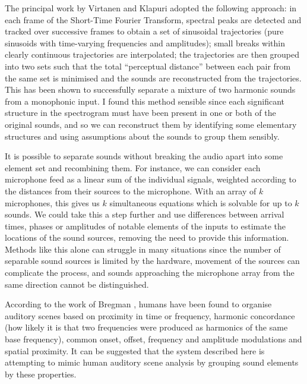 \documentclass[12pt,a4paper,twoside,openright]{report}
\begin{document}
The principal work by Virtanen and Klapuri \cite{virtanen2000separation} adopted the following approach: in each frame of the Short-Time Fourier Transform, spectral peaks are detected and tracked over successive frames to obtain a set of sinusoidal trajectories (pure sinusoids with time-varying frequencies and amplitudes); small breaks within clearly continuous trajectories are interpolated; the trajectories are then grouped into two sets such that the total ``perceptual distance'' between each pair from the same set is minimised and the sounds are reconstructed from the trajectories. This has been shown to successfully separate a mixture of two harmonic sounds from a monophonic input. I found this method sensible since each significant structure in the spectrogram must have been present in one or both of the original sounds, and so we can reconstruct them by identifying some elementary structures and using assumptions about the sounds to group them sensibly.


It is possible to separate sounds without breaking the audio apart into some element set and recombining them. For instance, we can consider each microphone feed as a linear sum of the individual signals, weighted according to the distances from their sources to the microphone. With an array of $ k $ microphones, this gives us $ k $ simultaneous equations which is solvable for up to $ k $ sounds. We could take this a step further and use differences between arrival times, phases or amplitudes of notable elements of the inputs to estimate the locations of the sound sources, removing the need to provide this information. Methods like this alone can struggle in many situations since the number of separable sound sources is limited by the hardware, movement of the sources can complicate the process, and sounds approaching the microphone array from the same direction cannot be distinguished.

According to the work of Bregman \cite{bregman1994auditory}, humans have been found to organise auditory scenes based on proximity in time or frequency, harmonic concordance (how likely it is that two frequencies were produced as harmonics of the same base frequency), common onset, offset, frequency and amplitude modulations and spatial proximity. It can be suggested that the system described here is attempting to mimic human auditory scene analysis by grouping sound elements by these properties.
\end{document}
